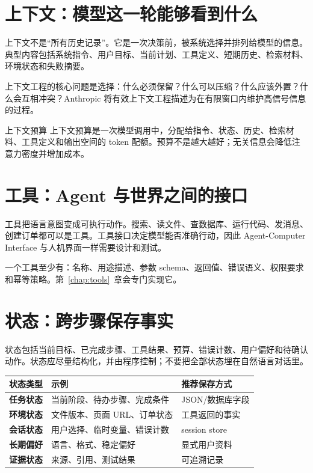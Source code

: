 \section{上下文：模型这一轮能够看到什么}

上下文不是“所有历史记录”。它是一次决策前，被系统选择并排列给模型的信息。典型内容包括系统指令、用户目标、当前计划、工具定义、短期历史、检索材料、环境状态和失败摘要。

上下文工程的核心问题是选择：什么必须保留？什么可以压缩？什么应该外置？什么会互相冲突？Anthropic 将有效上下文工程描述为在有限窗口内维护高信号信息的过程\citep{anthropic_context_engineering}。

\begin{definitionbox}{上下文预算}
上下文预算是一次模型调用中，分配给指令、状态、历史、检索材料、工具定义和输出空间的 token 配额。预算不是越大越好；无关信息会降低注意力密度并增加成本。
\end{definitionbox}

\section{工具：Agent 与世界之间的接口}

工具把语言意图变成可执行动作。搜索、读文件、查数据库、运行代码、发消息、创建订单都可以是工具。工具接口决定模型能否准确行动，因此 Agent-Computer Interface 与人机界面一样需要设计和测试\citep{anthropic_effective_agents}。

一个工具至少有：名称、用途描述、参数 schema、返回值、错误语义、权限要求和幂等策略。第~\ref{chap:tools}~章会专门实现它。

\section{状态：跨步骤保存事实}

状态包括当前目标、已完成步骤、工具结果、预算、错误计数、用户偏好和待确认动作。状态应尽量结构化，并由程序控制；不要把全部状态埋在自然语言对话里。

\begin{table}[htbp]
\centering
\begin{tabularx}{\textwidth}{>{\bfseries}p{} X X}
\toprule
状态类型 & 示例 & 推荐保存方式 \\
\midrule
任务状态 & 当前阶段、待办步骤、完成条件 & JSON/数据库字段 \\
环境状态 & 文件版本、页面 URL、订单状态 & 工具返回的事实 \\
会话状态 & 用户选择、临时变量、错误计数 & session store \\
长期偏好 & 语言、格式、稳定偏好 & 显式用户资料 \\
证据状态 & 来源、引用、测试结果 & 可追溯记录 \\
\bottomrule
\end{tabularx}
\end{table}

